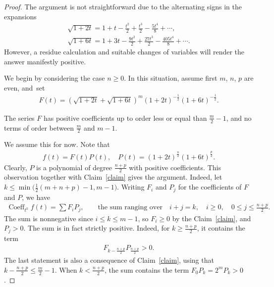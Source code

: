 \begin{proof}
The argument is not straightforward due to the alternating signs
in the expansions
\begin{gather*}
\sqrt{1+2t}= 1+t - \frac{t^2}{2}+\frac{t^3}{2}-\frac{5t^4}{8}+\cdots,
\\
\sqrt{1+6t}=1 + 3t - \frac{9t^2}{2}+\frac{27t^3}{2} - \frac{405 t^4}{8} +\cdots.
\end{gather*}
However, a residue calculation and suitable changes of variables will render the answer manifestly positive.

We begin by considering the case $n\geq 0$. In this situation, assume first $m$, $n$, $p$ are even, and~set
\begin{gather*}
F(t)=\left(\sqrt{1+2t}+\sqrt{1+6t}\right)^m {(1+2t)}^{-\frac{1}{2}} (1+6t)^{-\frac{1}{2}}.
\end{gather*}

\begin{Claim}\label{claim}
The series $F$ has positive coefficients up to order less or equal than $\frac{m}{2}-1$, and no terms of order between $\frac{m}{2}$ and $m-1$.
\end{Claim}


We assume this for now. Note that
\begin{gather*}
f(t)=F(t) P(t), \quad P(t)=(1+2t)^{\frac{n}{2}} (1+6t)^{\frac{p}{2}}.
\end{gather*}
Clearly, $P$ is a polynomial of degree $\frac{n+p}{2}$ with positive coefficients. This observation together with Claim~\ref{claim} gives the argument. Indeed, let $k\leq \min\big(\frac{1}{2}(m+n+p)-1, m-1\big)$. Writing $F_i$ and $P_j$ for the coefficients of $F$ and $P$, we have
\begin{gather*}
\operatorname{Coeff}_{ t^k} f(t)=\sum F_iP_j, \qquad\text{the sum ranging over}\quad i+j=k, \quad i\geq 0,\quad 0\leq j\leq \frac{n+p}{2}.
\end{gather*}
The sum is nonnegative since $i\leq k\leq m-1$, so $F_i\geq 0$ by the Claim~\ref{claim}, and $P_j> 0$. The sum is in fact strictly positive. Indeed, for $k\geq \frac{n+p}{2}$, it contains the term
\begin{gather*}
F_{k-\frac{n+p}{2}} P_{\frac{n+p}{2}}>0.
\end{gather*}
The last statement is also a consequence of Claim~\ref{claim}, using that $k-\frac{n+p}{2}\leq\frac{m}{2}-1$. When $k<\frac{n+p}{2}$, the sum contains the term $F_0 P_k=2^m P_k>0$.


\end{proof}
